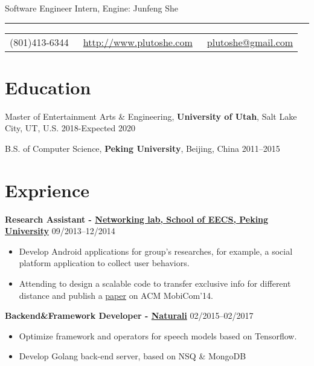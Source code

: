 \documentclass{article}
\begin{document}
	
	\color{text1} %
	
	\par{\centering
		{\sffamily\huge Software Engineer Intern, Engine: Junfeng She
		}\\	
		{\color{headings} \par}
		{\color{white} \hrule} %
		
		\vspace{10pt}
		
		\colorbox{mygrey}{\textcolor{text1}{
				\begin{tabular}{c|c|c}
					\raisebox{-2pt}{\Phone} (801)413-6344 &
					\raisebox{-2pt}{\Envelope} ~\href{http://www.plutoshe.com}{http://www.plutoshe.com}	 &	 \raisebox{0pt}{\textbf{@}}
					~\href{mailto:plutoshe@gmail.com}{plutoshe@gmail.com}
				\end{tabular}
			}
		}
		\vspace{10pt}
		
		\section{Education}
		\vspace{5pt}
		Master of Entertainment Arts \& Engineering, \textbf{University of Utah}, Salt Lake City, UT, U.S. \hfill 2018-Expected 2020
		\vspace{5pt}
		
		B.S. of Computer Science, \textbf{Peking University}, Beijing, China \hfill 2011--2015
		\vspace{10pt}
		
		\section{Exprience}
		\textbf{Research Assistant - \href{http://net.pku.edu.cn/mobile/doku.php?id=eng:start}{Networking lab, School of EECS, Peking University}} \hfill 09/2013--12/2014
			\begin{itemize}
				\item Develop Android applications for group's researches, for example, a social platform application to collect user behaviors.
				\item Attending to design a scalable code to transfer exclusive info for different distance and publish a \href{https://www.eng.yale.edu/wenjun/papers/strata.pdf}{paper} on ACM MobiCom'14.
			\end{itemize}
		\textbf{Backend\&Framework Developer - \href{https://naturali.io}{Naturali}} \hfill 02/2015--02/2017
		\begin{itemize}
			\item Optimize framework and operators for speech models based on Tensorflow.
			\item Develop Golang back-end server, based on NSQ \& MongoDB
		\end{itemize}
		
}
\end{document}
